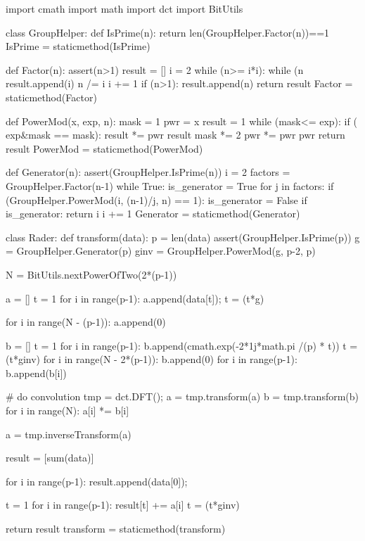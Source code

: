 \begin{python}
import cmath
import math
import dct
import BitUtils

class GroupHelper:
    def IsPrime(n):
        return len(GroupHelper.Factor(n))==1
    IsPrime = staticmethod(IsPrime)

    def Factor(n):
        assert(n>1)
        result = []
        i = 2
        while (n>= i*i):
            while (n%
                result.append(i)
                n /= i
            i += 1
        if (n>1):
            result.append(n)
        return result
    Factor = staticmethod(Factor)

    def PowerMod(x, exp, n):
        mask = 1
        pwr = x
        result = 1
        while (mask<= exp):
            if ( exp&mask == mask):
                result *= pwr
                result %
            mask *= 2
            pwr *= pwr
            pwr %
        return result
    PowerMod = staticmethod(PowerMod)

    def Generator(n):
        assert(GroupHelper.IsPrime(n))
        i = 2
        factors = GroupHelper.Factor(n-1)
        while True:
            is_generator = True
            for j in factors:
                if (GroupHelper.PowerMod(i, (n-1)/j, n) == 1):
                    is_generator = False
            if is_generator:
                return i
            i += 1
    Generator = staticmethod(Generator)


class Rader:
    def transform(data):
        p = len(data)
        assert(GroupHelper.IsPrime(p))
        g = GroupHelper.Generator(p)
        ginv = GroupHelper.PowerMod(g, p-2, p)


        N = BitUtils.nextPowerOfTwo(2*(p-1))

        a = []
        t = 1
        for i in range(p-1):
            a.append(data[t]);
            t = (t*g) %
        
        for i in range(N - (p-1)):
            a.append(0)

        b = []
        t = 1
        for i in range(p-1):
            b.append(cmath.exp(-2*1j*math.pi /(p) * t))
            t = (t*ginv) %
        for i in range(N - 2*(p-1)):
            b.append(0)
        for i in range(p-1):
            b.append(b[i])

        # do convolution
        tmp = dct.DFT();
        a = tmp.transform(a)
        b = tmp.transform(b)
        for i in range(N):
            a[i] *= b[i]

        a = tmp.inverseTransform(a)

        result = [sum(data)]
            
        for i in range(p-1):        
            result.append(data[0]);

        t = 1
        for i in range(p-1):
            result[t] += a[i]
            t = (t*ginv)%

        return result
    transform = staticmethod(transform)
\end{python}
